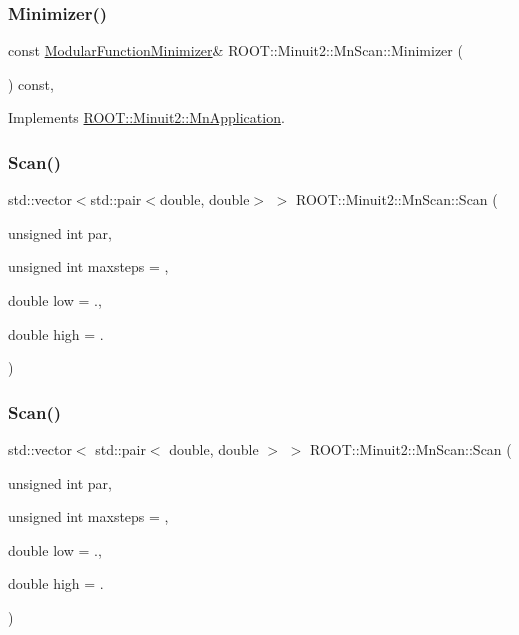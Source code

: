\subsubsection{\texorpdfstring{Minimizer()}{Minimizer()}\hspace{0.1cm}{\footnotesize\ttfamily [2/2]}}
{\footnotesize\ttfamily const \mbox{\hyperlink{classROOT_1_1Minuit2_1_1ModularFunctionMinimizer}{Modular\+Function\+Minimizer}}\& R\+O\+O\+T\+::\+Minuit2\+::\+Mn\+Scan\+::\+Minimizer (\begin{DoxyParamCaption}{ }\end{DoxyParamCaption}) const\hspace{0.3cm}{\ttfamily [inline]}, {\ttfamily [virtual]}}



Implements \mbox{\hyperlink{classROOT_1_1Minuit2_1_1MnApplication_a5a8e1e2658b731b5f4023dd1b1594223}{R\+O\+O\+T\+::\+Minuit2\+::\+Mn\+Application}}.

\mbox{\label{classROOT_1_1Minuit2_1_1MnScan_aaad559ec656a90df6e3283885ff2e7ca}} 
\subsubsection{\texorpdfstring{Scan()}{Scan()}\hspace{0.1cm}{\footnotesize\ttfamily [1/2]}}
{\footnotesize\ttfamily std\+::vector$<$std\+::pair$<$double, double$>$ $>$ R\+O\+O\+T\+::\+Minuit2\+::\+Mn\+Scan\+::\+Scan (\begin{DoxyParamCaption}\item[{unsigned int}]{par,  }\item[{unsigned int}]{maxsteps = {},  }\item[{double}]{low = {.},  }\item[{double}]{high = {.} }\end{DoxyParamCaption})}

\mbox{\label{classROOT_1_1Minuit2_1_1MnScan_ae488bb0cc7b7127847fdccdadced3ced}} 
\subsubsection{\texorpdfstring{Scan()}{Scan()}\hspace{0.1cm}{\footnotesize\ttfamily [2/2]}}
{\footnotesize\ttfamily std\+::vector$<$ std\+::pair$<$ double, double $>$ $>$ R\+O\+O\+T\+::\+Minuit2\+::\+Mn\+Scan\+::\+Scan (\begin{DoxyParamCaption}\item[{unsigned int}]{par,  }\item[{unsigned int}]{maxsteps = {},  }\item[{double}]{low = {.},  }\item[{double}]{high = {.} }\end{DoxyParamCaption})}

